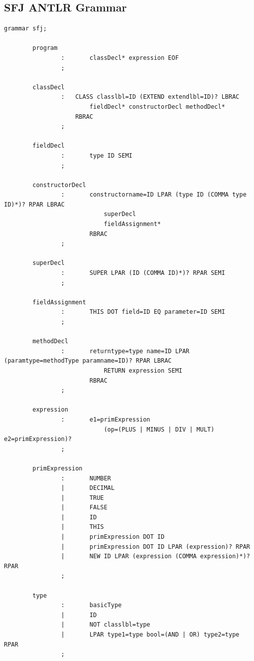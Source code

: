 \documentclass{l4proj}
\begin{document}
\begin{appendices}


    \chapter{SFJ ANTLR Grammar}

    \begin{lstlisting}[label={lst:sfjgram}, caption={The full ANTLR grammar for SFJ language}]
        grammar sfj;

        program
                :       classDecl* expression EOF
                ;

        classDecl
                :   CLASS classlbl=ID (EXTEND extendlbl=ID)? LBRAC
                        fieldDecl* constructorDecl methodDecl*
                    RBRAC
                ;

        fieldDecl
                :       type ID SEMI
                ;

        constructorDecl
                :       constructorname=ID LPAR (type ID (COMMA type ID)*)? RPAR LBRAC
                            superDecl
                            fieldAssignment*
                        RBRAC
                ;

        superDecl
                :       SUPER LPAR (ID (COMMA ID)*)? RPAR SEMI
                ;

        fieldAssignment
                :       THIS DOT field=ID EQ parameter=ID SEMI
                ;

        methodDecl
                :       returntype=type name=ID LPAR (paramtype=methodType paramname=ID)? RPAR LBRAC
                            RETURN expression SEMI
                        RBRAC
                ;

        expression
                :       e1=primExpression
                            (op=(PLUS | MINUS | DIV | MULT) e2=primExpression)?
                ;

        primExpression
                :       NUMBER
                |       DECIMAL
                |       TRUE
                |       FALSE
                |       ID
                |       THIS
                |       primExpression DOT ID
                |       primExpression DOT ID LPAR (expression)? RPAR
                |       NEW ID LPAR (expression (COMMA expression)*)? RPAR
                ;

        type
                :       basicType
                |       ID
                |       NOT classlbl=type
                |       LPAR type1=type bool=(AND | OR) type2=type RPAR
                ;


\end{lstlisting}
\end{appendices}
\end{document}
